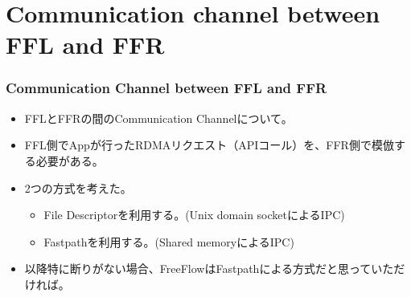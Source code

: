 \documentclass[dvipdfmx,9pt,notheorems]{beamer}
\theoremstyle{definition}
\begin{document}
\section{Communication channel between FFL and FFR}
\begin{frame}\frametitle{Communication Channel between FFL and FFR}
	\begin{itemize}
		\item FFLとFFRの間のCommunication Channelについて。
		\item FFL側でAppが行ったRDMAリクエスト（APIコール）を、FFR側で模倣する必要がある。
		\item 2つの方式を考えた。
		\begin{itemize}
			\item File Descriptorを利用する。(Unix domain socketによるIPC)
			\item Fastpathを利用する。(Shared memoryによるIPC)
		\end{itemize}
		\item 以降特に断りがない場合、FreeFlowはFastpathによる方式だと思っていただければ。
	\end{itemize}
\end{frame}
\end{document}
